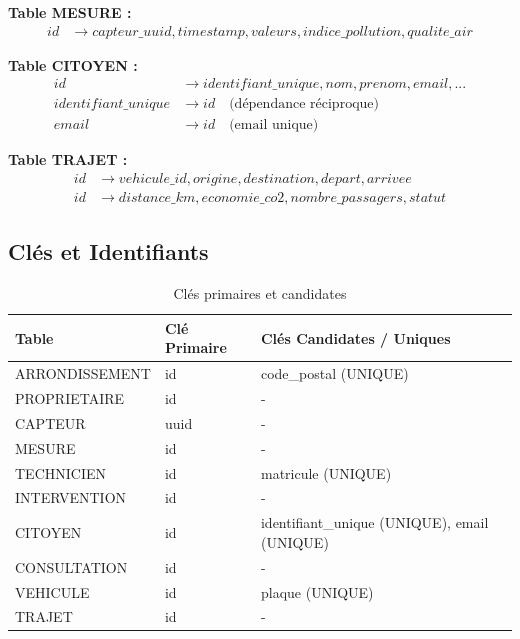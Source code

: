 \documentclass[12pt,a4paper]{article}
\begin{document}
\textbf{Table MESURE :}
\begin{align*}
id &\rightarrow capteur\_uuid, timestamp, valeurs, indice\_pollution, qualite\_air
\end{align*}

\textbf{Table CITOYEN :}
\begin{align*}
id &\rightarrow identifiant\_unique, nom, prenom, email, ... \\
identifiant\_unique &\rightarrow id \quad \text{(dépendance réciproque)}\\
email &\rightarrow id \quad \text{(email unique)}
\end{align*}

\textbf{Table TRAJET :}
\begin{align*}
id &\rightarrow vehicule\_id, origine, destination, depart, arrivee \\
id &\rightarrow distance\_km, economie\_co2, nombre\_passagers, statut
\end{align*}

\subsection{Clés et Identifiants}

\begin{table}[h]
\centering
\begin{tabular}{|l|l|l|}
\hline
\textbf{Table} & \textbf{Clé Primaire} & \textbf{Clés Candidates / Uniques} \\
\hline
ARRONDISSEMENT & id & code\_postal (UNIQUE) \\
\hline
PROPRIETAIRE & id & - \\
\hline
CAPTEUR & uuid & - \\
\hline
MESURE & id & - \\
\hline
TECHNICIEN & id & matricule (UNIQUE) \\
\hline
INTERVENTION & id & - \\
\hline
CITOYEN & id & identifiant\_unique (UNIQUE), email (UNIQUE) \\
\hline
CONSULTATION & id & - \\
\hline
VEHICULE & id & plaque (UNIQUE) \\
\hline
TRAJET & id & - \\
\hline
\end{tabular}
\caption{Clés primaires et candidates}
\end{table}
\end{document}
